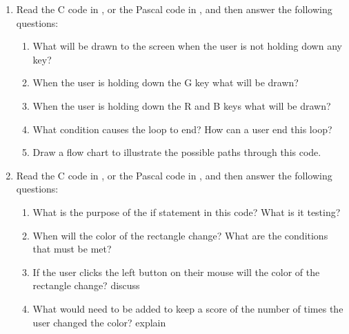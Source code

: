 \begin{enumerate}
  \item Read the C code in , or the Pascal code in , and then answer the following questions:
  \begin{enumerate}
    \item What will be drawn to the screen when the user is not holding down any key?
    \item When the user is holding down the G key what will be drawn?
    \item When the user is holding down the R and B keys what will be drawn?
    \item What condition causes the loop to end? How can a user end this loop?
    \item Draw a flow chart to illustrate the possible paths through this code.
  \end{enumerate}
  \begin{figure}[h]
  \end{figure}
  \begin{figure}[h]
  \end{figure}
  \clearpage
  
  \item Read the C code in , or the Pascal code in , and then answer the following questions:
  \begin{enumerate}
    \item What is the purpose of the if statement in this code? What is it testing?
    \item When will the color of the rectangle change? What are the conditions that must be met?
    \item If the user clicks the left button on their mouse will the color of the rectangle change? discuss
    \item What would need to be added to keep a score of the number of times the user changed the color? explain
  \end{enumerate}
  
  \bigskip
  

\end{enumerate}
